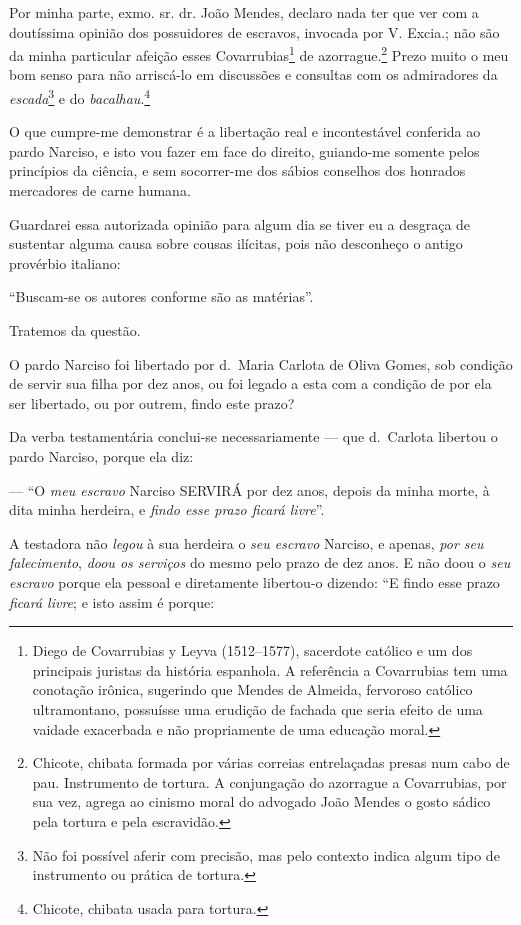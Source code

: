{Por minha parte, exmo. sr. dr. João Mendes, declaro nada ter que ver com
a doutíssima opinião dos possuidores de escravos, invocada por V.
Excia.; não são da minha particular afeição esses Covarrubias\footnote{
  Diego de Covarrubias y Leyva (1512--1577), sacerdote católico e um dos
  principais juristas da história espanhola. A referência a Covarrubias
  tem uma conotação irônica, sugerindo que Mendes de Almeida, fervoroso
  católico ultramontano, possuísse uma erudição de fachada que seria
  efeito de uma vaidade exacerbada e não propriamente de uma educação
  moral.} de azorrague\textsuperscript{⁠}.\footnote{ Chicote,
  chibata formada por várias correias entrelaçadas presas num cabo de
  pau. Instrumento de tortura. A conjungação do azorrague a Covarrubias,
  por sua vez, agrega ao cinismo moral do advogado João Mendes o gosto
  sádico pela tortura e pela escravidão.} Prezo muito o meu bom senso
para não arriscá-lo em discussões e consultas com os admiradores da
\emph{escada}\footnote{ Não foi possível aferir com precisão, mas
  pelo contexto indica algum tipo de instrumento ou prática de tortura.}
e do \emph{bacalhau}.\footnote{ Chicote, chibata usada para tortura.}

O que cumpre-me demonstrar é a libertação real e incontestável conferida
ao pardo Narciso, e isto vou fazer em face do direito, guiando-me
somente pelos princípios da ciência, e sem socorrer-me dos sábios
conselhos dos honrados mercadores de carne humana.

Guardarei essa autorizada opinião para algum dia se tiver eu a desgraça
de sustentar alguma causa sobre cousas ilícitas, pois não desconheço o
antigo provérbio italiano:

``Buscam-se os autores conforme são as matérias''.

Tratemos da questão.

O pardo Narciso foi libertado por d.~Maria Carlota de Oliva Gomes, sob
condição de servir sua filha por dez anos, ou foi legado a esta com a
condição de por ela ser libertado, ou por outrem, findo este prazo?

Da verba testamentária conclui-se necessariamente --- que d.~Carlota
libertou o pardo Narciso, porque ela diz:

--- ``O \emph{meu escravo} Narciso SERVIRÁ por dez anos, depois da minha
morte, à dita minha herdeira, e \emph{findo esse prazo ficará livre}''.

A testadora não \emph{legou} à sua herdeira o \emph{seu escravo}
Narciso, e apenas, \emph{por seu falecimento}, \emph{doou os serviços}
do mesmo pelo prazo de dez anos. E não doou o \emph{seu escravo} porque
ela pessoal e diretamente libertou-o dizendo: ``E findo esse prazo
\emph{ficará livre}; e isto assim é porque:

}
